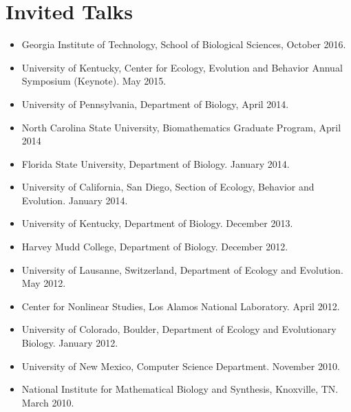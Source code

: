 \documentclass[11pt]{article}
\begin{document}
  \section{Invited Talks}
  \begin{itemize}
  \item Georgia Institute of Technology, School of Biological Sciences, October 2016.
  \item University of Kentucky, Center for Ecology, Evolution and Behavior Annual Symposium (Keynote). May 2015.
  \item University of Pennsylvania, Department of Biology, April 2014.
  \item North Carolina State University, Biomathematics Graduate Program, April 2014
  \item Florida State University, Department of Biology.  January 2014.
  \item University of California, San Diego, Section of Ecology, Behavior and Evolution.  January 2014.
  \item University of Kentucky, Department of Biology. December 2013.
  \item Harvey Mudd College, Department of Biology. December 2012.
  \item %
    University of Lausanne, Switzerland, Department of Ecology and Evolution. May 2012.
  \item %
    Center for Nonlinear Studies, Los Alamos National Laboratory. April 2012.
  \item %
    University of Colorado, Boulder, Department of Ecology and Evolutionary Biology. January 2012.
  \item %
    University of New Mexico, Computer Science Department. November 2010.
  \item %
    National Institute for Mathematical Biology and Synthesis, Knoxville, TN. March 2010.
  \end{itemize}
  
\end{document}
